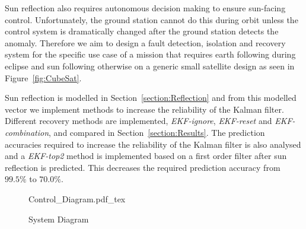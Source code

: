 \documentclass[letterpaper, 10 pt, conference]{ieeeconf}  %
\begin{document}
Sun reflection also requires autonomous decision making to ensure sun-facing control. Unfortunately, the ground station cannot do this during orbit unless the control system is dramatically changed after the ground station detects the anomaly. Therefore we aim to design a fault detection, isolation and recovery system for the specific use case of a mission that requires earth following during eclipse and sun following otherwise on a generic small satellite design as seen in Figure~\ref{fig:CubeSat}.

Sun reflection is modelled in Section~\ref{section:Reflection} and from this modelled vector we implement methods to increase the reliability of the Kalman filter. Different recovery methods are implemented, \emph{EKF-ignore}, \emph{EKF-reset} and \emph{EKF-combination}, and compared in Section~\ref{section:Results}. The prediction accuracies required to increase the reliability of the Kalman filter is also analysed and a \emph{EKF-top2} method is implemented based on a first order filter after sun reflection is predicted. This decreases the required prediction accuracy from $99.5\%$ to $70.0\%$.


\begin{figure}[h!b!t]
	\centering
	\def\svgwidth{14cm}
	{Control_Diagram.pdf_tex}
	\caption{System Diagram}
	\label{fig:System_Diagram}
\end{figure}


%
\end{document}
